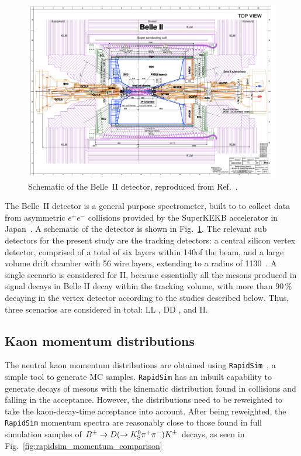 \begin{figure}[tb]
  \centering
  \includegraphics[width=0.8\columnwidth]{figures/ks_chapter/belledetector.png}
  \caption{Schematic of the Belle~II detector, reproduced from Ref.~\cite{kouBelleIIPhysics2019}.}
  \label{fig:belleII_detector}
\end{figure}

The Belle~II detector is a general purpose spectrometer, built to to collect data from asymmetric $e^+e^-$ collisions provided by the SuperKEKB accelerator in Japan~\cite{ohnishiAcceleratorDesignSuperKEKB2013}. A schematic of the detector is shown in Fig.~\ref{fig:belleII_detector}. The relevant sub detectors for the present study are the tracking detectors: a central silicon vertex detector, comprised of a total of six layers within 140\mm of the beam, and a large volume drift chamber with 56 wire layers, extending to a radius of 1130\mm~\cite{kouBelleIIPhysics2019}. 
A single scenario is considered for \belle II, because essentially all the \KS mesons produced in signal decays in Belle II decay within the tracking volume, with more than 90\,\% decaying in the vertex detector according to the studies described below. Thus, three scenarios are considered in total: LL \lhcb, DD \lhcb, and \belle II.


\subsection{Kaon momentum distributions} %
\label{sub:kaon_momentum_distributions}

The neutral kaon momentum distributions are obtained using \texttt{RapidSim}~\cite{cowanRapidSimApplicationFast2017}, a simple tool to generate MC samples. \texttt{RapidSim} has an inbuilt capability to generate decays of \B mesons with the kinematic distribution found in \lhcb collisions and falling in the \lhcb acceptance. However, the distributions need to be reweighted to take the kaon-decay-time acceptance into account. After being reweighted, the \texttt{RapidSim} momentum spectra are reasonably close to those found in full \lhcb simulation samples of ${{B}^\pm}\rightarrow{\ensuremath{D}}(\rightarrow{\ensuremath{{K}^0_{\mathrm{S}}}}{\ensuremath{{\pi}^+}}{\ensuremath{{\pi}^-}}){{K}^\pm}$ decays, as seen in Fig.~\ref{fig:rapidsim_momentum_comparison}



